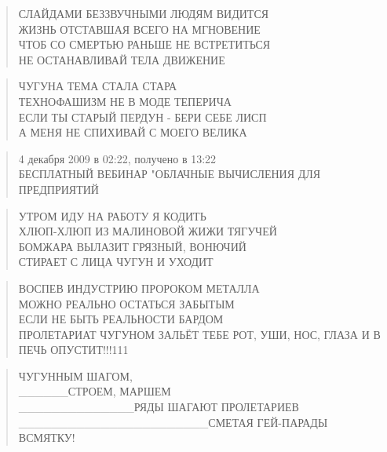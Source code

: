 \poemtitle{***}
\begin{verse}
СЛАЙДАМИ БЕЗЗВУЧНЫМИ ЛЮДЯМ ВИДИТСЯ\\
ЖИЗНЬ ОТСТАВШАЯ ВСЕГО НА МГНОВЕНИЕ\\
ЧТОБ СО СМЕРТЬЮ РАНЬШЕ НЕ ВСТРЕТИТЬСЯ\\
НЕ ОСТАНАВЛИВАЙ ТЕЛА ДВИЖЕНИЕ
\end{verse}

\poemtitle{***}
\begin{verse}
ЧУГУНА ТЕМА СТАЛА СТАРА\\
ТЕХНОФАШИЗМ НЕ В МОДЕ ТЕПЕРИЧА\\
ЕСЛИ ТЫ СТАРЫЙ ПЕРДУН - БЕРИ СЕБЕ ЛИСП\\
А МЕНЯ НЕ СПИХИВАЙ С МОЕГО ВЕЛИКА
\end{verse}

\poemtitle{***}
\begin{verse}
4 декабря 2009 в 02:22, получено в 13:22\\
БЕСПЛАТНЫЙ ВЕБИНАР "ОБЛАЧНЫЕ ВЫЧИСЛЕНИЯ ДЛЯ ПРЕДПРИЯТИЙ    
\end{verse}

\poemtitle{***}
\begin{verse}
УТРОМ ИДУ  НА РАБОТУ Я КОДИТЬ\\
ХЛЮП-ХЛЮП ИЗ МАЛИНОВОЙ ЖИЖИ ТЯГУЧЕЙ\\
БОМЖАРА ВЫЛАЗИТ ГРЯЗНЫЙ, ВОНЮЧИЙ\\
СТИРАЕТ С ЛИЦА ЧУГУН И УХОДИТ
\end{verse}

\poemtitle{***}
\begin{verse}
ВОСПЕВ ИНДУСТРИЮ ПРОРОКОМ МЕТАЛЛА\\
МОЖНО РЕАЛЬНО ОСТАТЬСЯ ЗАБЫТЫМ\\
ЕСЛИ НЕ БЫТЬ РЕАЛЬНОСТИ БАРДОМ\\
ПРОЛЕТАРИАТ ЧУГУНОМ ЗАЛЬЁТ ТЕБЕ РОТ, УШИ, НОС, ГЛАЗА И В ПЕЧЬ ОПУСТИТ!!!111
\end{verse}

\poemtitle{***}
\begin{verse}
ЧУГУННЫМ ШАГОМ,\\
\_\_\_\_\_\_СТРОЕМ, МАРШЕМ\\
\_\_\_\_\_\_\_\_\_\_\_\_\_\_РЯДЫ ШАГАЮТ ПРОЛЕТАРИЕВ\\
\_\_\_\_\_\_\_\_\_\_\_\_\_\_\_\_\_\_\_\_\_\_\_СМЕТАЯ ГЕЙ-ПАРАДЫ ВСМЯТКУ!
\end{verse}

